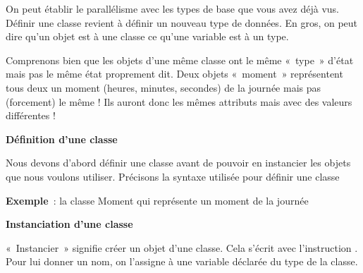 On peut établir le parallélisme avec les types de base que vous avez
déjà vus. Définir une classe revient à définir un nouveau type de
données. En gros, on peut dire qu'un\textbf{ }objet
est à une classe ce qu'une variable est à un type.

Comprenons bien que les objets d'une même classe ont le
même «~type~» d'état mais pas le même état proprement
dit. Deux objets «~moment~» représentent tous deux un moment 
(heures, minutes, secondes) de la journée mais pas (forcement) 
le même ! Ils auront donc les mêmes attributs mais
avec des valeurs différentes !

{\sffamily\bfseries\upshape
Définition d'une classe}

{
Nous devons d'abord définir une classe avant de pouvoir
en instancier les objets que nous voulons utiliser. Précisons la
syntaxe utilisée pour définir une classe}


\clearpage

{
\textbf{Exemple}~: la classe Moment qui représente un moment de la
journée}


\bigskip

{\sffamily\bfseries\upshape
Instanciation d'une classe}

{«~Instancier~» signifie créer un objet d'une classe.
Cela s'écrit avec l'instruction
. Pour lui donner un nom, on
l'assigne à une variable déclarée du type de la
classe.}

